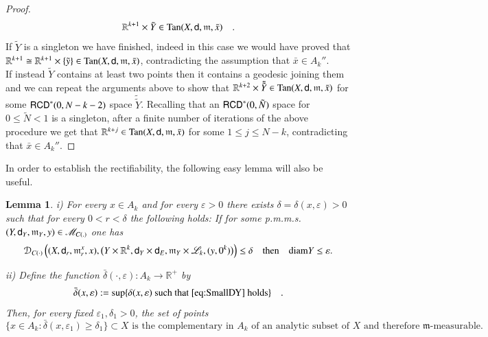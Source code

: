 \documentclass[11pt,reqno]{amsart}
\newcommand{\MM}{\mathscr{M}}
\newcommand{\diam}{\text{diam}}
\newcommand{\mm}{\mathfrak m}
\newcommand{\sfd}{{\sf d}}
\newcommand{\LL}{\mathscr{L}}
\newcommand{\R}{\mathbb{R}}
\newcommand{\Tan}{{\rm Tan}}
\newcommand{\RCD}{{\sf RCD}}
\newcommand{\vare}{\varepsilon}
\newtheorem{lemma}[theorem]{Lemma}
\theoremstyle{definition}
\theoremstyle{remark}
\theoremstyle{remark}
\theoremstyle{remark}
\theoremstyle{remark}
\theoremstyle{remark}
\theoremstyle{remark}
\theoremstyle{remark}
\begin{document}
\begin{proof}
$$\R^{k+1}\times \tilde{Y}  \in \Tan(X,\sfd,\mm,\bar{x}) \quad .$$
If $\tilde{Y}$ is a singleton we have finished, indeed in this case we would have proved that $\R^{k+1} \cong \R^{k+1}\times \{\tilde{y}\} \in  \Tan(X,\sfd,\mm,\bar{x})$, contradicting the assumption that $\bar{x}\in A_k''$.
\\If instead $\tilde{Y}$  contains at least two points  then it contains a geodesic joining them and we can repeat the arguments above to show that $\R^{k+2}\times \tilde{{\tilde{Y}}}  \in \Tan(X,\sfd,\mm,\bar{x})$ for some $\RCD^*(0,N-k-2)$ space   $\tilde{{\tilde{Y}}}$.  Recalling that an $\RCD^*(0,\tilde{N})$ space for $0\leq \tilde{N} < 1$ is a singleton, after a finite number of iterations of the above procedure we get that $\R^{k+j}\in \Tan(X,\sfd,\mm,\bar{x})$ for some $1\leq j \leq N-k$, contradicting that $\bar{x}\in A_k''$.
\end{proof}

In order to establish the rectifiability, the following easy lemma will also be useful.  

\begin{lemma}\label{lem:delta}
i) For every $x \in A_k$ and for every $\vare>0$ there exists $\delta=\delta(x,\vare)>0$ such that for every $0<r<\delta$ the following holds: If for some p.m.m.s. $(Y,\sfd_Y, \mm_Y, y)\in \MM_{C(.)}$ one has
\begin{equation}\label{eq:SmallDY}
\mathcal D_{C(\cdot)} \left((X,\sfd_r, \mm^x_r, x), \big(Y\times \R^k, \sfd_{Y}\times \sfd_E, \mm_Y \times \LL_k, (y,0^k) \big) \right) \leq \delta \quad \text{then} \quad  \diam{Y}\leq \vare.
\end{equation}

ii) Define the function $\bar{\delta}(\cdot, \vare):A_k \to \R^+$ by
\begin{equation} \label{eq:defbardelta}
\bar{\delta}(x, \vare):= \sup \{ \delta(x, \vare) \text{ such that  \eqref{eq:SmallDY} holds} \} \quad .
\end{equation}
Then, for every fixed $\vare_1, \delta_1>0$, the set of points 
\begin{equation}\label{eq:d1meas}
\{x \in A_k: \bar{\delta}(x, \vare_1)\geq \delta_1\} \subset X \text{ is the complementary  in $A_k$ of an analytic subset of $X$ and therefore $\mm$-measurable.}
\end{equation}
\end{lemma}
\end{document}
